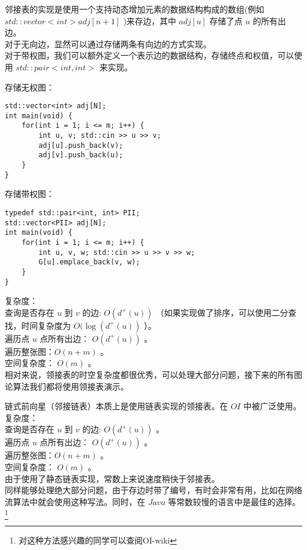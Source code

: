 \documentclass{beamer}
\begin{document}
\begin{frame}[fragile]
邻接表的实现是使用一个支持动态增加元素的数据结构构成的数组(例如 $std::vector<int> adj[n + 1]$ )来存边，其中 $adj[u]$ 存储了点 $u$ 的所有出边。\\ 
对于无向边，显然可以通过存储两条有向边的方式实现。\\
对于带权图，我们可以额外定义一个表示边的数据结构，存储终点和权值，可以使用 $std::pair<int, int>$ 来实现。\\ 
\end{frame}
\begin{frame}[fragile]
存储无权图：
\begin{onlyenv}
\begin{verbatim}
std::vector<int> adj[N];
int main(void) {
    for(int i = 1; i <= m; i++) {
        int u, v; std::cin >> u >> v;
        adj[u].push_back(v);
        adj[v].push_back(u);
    }
}
\end{verbatim}
\end{onlyenv}
存储带权图：
\begin{onlyenv}
\begin{verbatim}
typedef std::pair<int, int> PII;
std::vector<PII> adj[N];
int main(void) {
    for(int i = 1; i <= m; i++) {
        int u, v, w; std::cin >> u >> v >> w;
        G[u].emplace_back(v, w);
    }
}
\end{verbatim}
\end{onlyenv}
\end{frame}
\begin{frame}
复杂度：\\
查询是否存在 $u$ 到 $v$ 的边: $O(d^+(u))$ （如果实现做了排序，可以使用二分查找，时间复杂度为 $O(\log(d^+(u))$ ）。\\ 
遍历点 $u$ 点所有出边： $O(d^+(u))$ 。\\ 
遍历整张图：$O(n + m)$ 。 \\
空间复杂度： $O(m)$ 。 \\ 
相对来说，领接表的时空复杂度都很优秀，可以处理大部分问题，接下来的所有图论算法我们都将使用领接表演示。
\end{frame}
\begin{frame}
链式前向星（邻接链表）本质上是使用链表实现的领接表。在 $OI$ 中被广泛使用。 \\ 
复杂度：\\ 
查询是否存在 $u$ 到 $v$ 的边: $O(d^+(u))$ 。\\ 
遍历点 $u$ 点所有出边： $O(d^+(u))$ 。\\ 
遍历整张图：$O(n + m)$ 。 \\
空间复杂度： $O(m)$ 。 \\ 
由于使用了静态链表实现，常数上来说速度稍快于邻接表。\\
同样能够处理绝大部分问题，由于存边时带了编号，有时会非常有用，比如在网络流算法中就会使用这种写法。同时，在 $Java$ 等常数较慢的语言中是最佳的选择。\footnote{对这种方法感兴趣的同学可以查阅OI-wiki}
\end{frame}
\end{document}
